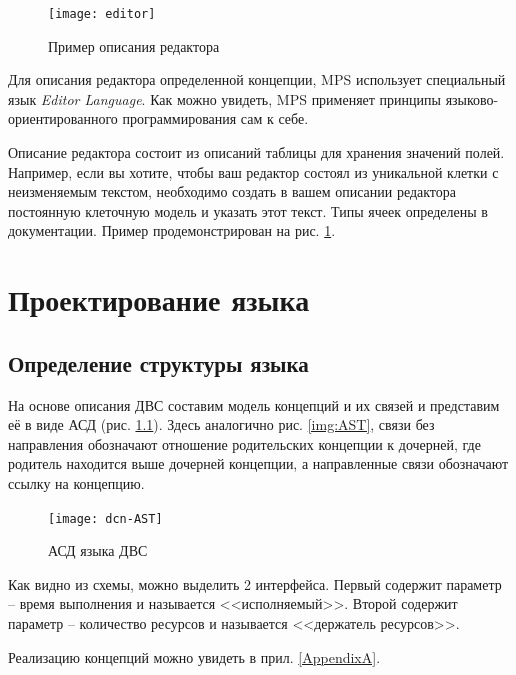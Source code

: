 		\begin{figure}[ht] 
			\center
			\texttt{[image: editor]}
			\caption{Пример описания редактора} 
			\label{img:editor}  
		\end{figure}
		
		Для описания редактора определенной концепции, MPS использует специальный язык \textit{Editor Language}. Как можно увидеть, MPS применяет принципы языково-ориентированного программирования сам к себе. 
		
		Описание редактора состоит из описаний таблицы для хранения значений полей. Например, если вы хотите, чтобы ваш редактор состоял из уникальной клетки с неизменяемым текстом, необходимо создать в вашем описании редактора постоянную клеточную модель и указать этот текст. Типы ячеек определены в документации. Пример продемонстрирован на рис. \ref{img:editor}.
		

		
\chapter{Проектирование языка}
	\section{Определение структуры языка}
		
		На основе описания ДВС составим модель концепций и их связей и представим её в виде АСД (рис. \ref{img:dcn-AST}). Здесь аналогично рис. \ref{img:AST}, связи без направления обозначают отношение родительских концепции к дочерней, где родитель находится выше дочерней концепции, а направленные связи обозначают ссылку на концепцию.
		
		\begin{figure}[ht] 
			\center
			\texttt{[image: dcn-AST]}
			\caption{АСД языка ДВС} 
			\label{img:dcn-AST}  
		\end{figure}
	
		Как видно из схемы, можно выделить 2 интерфейса. Первый содержит параметр -- время выполнения и называется <<исполняемый>>. Второй содержит параметр -- количество ресурсов и называется <<держатель ресурсов>>.
	
		Реализацию концепций можно увидеть в прил. \ref{AppendixA}.
		
		    
